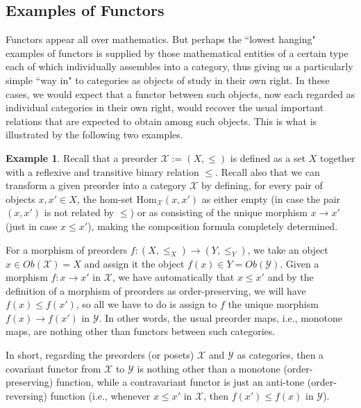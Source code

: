 \documentclass[a4paper]{book}
\theoremstyle{definition}
\newtheorem{example}{Example}[section]
\theoremstyle{definition}
\theoremstyle{definition}
\theoremstyle{theorem}
\theoremstyle{definition}
\begin{document}
\subsection{Examples of Functors}
Functors appear all over mathematics. But perhaps the ``lowest hanging" examples of functors is supplied by those mathematical entities of a certain type each of which individually assembles into a category, thus giving us a particularly simple ``way in" to categories as objects of study in their own right. In these cases, we would expect that a functor between such objects, now each regarded as individual categories in their own right, would recover the usual important relations that are expected to obtain among such objects. This is what is illustrated by the following two examples.   
\begin{example}
	Recall that a preorder $\mathcal{X} := (X, \leq)$ is defined as a set $X$ together with a reflexive and transitive binary relation $\leq$. Recall also that we can transform a given preorder into a category $\mathcal{X}$ by defining, for every pair of objects $x,x' \in X$, the hom-set $\text{Hom}_{\mathcal{X}}(x,x')$ as either empty (in case the pair $(x,x')$ is not related by $\leq$) or as consisting of the unique morphism $x \rightarrow x'$ (just in case $x \leq x'$), making the composition formula completely determined. \par 
	For a morphism of preorders $f: (X, \leq_X) \rightarrow (Y, \leq_Y)$, we take an object $x \in Ob(\mathcal{X}) = X$ and assign it the object $f(x) \in Y = Ob(\mathcal{Y})$. Given a morphism $f: x \rightarrow x'$ in $\mathcal{X}$, we have automatically that $x \leq x'$ and by the definition of a morphism of preorders as order-preserving, we will have $f(x) \leq f(x')$, so all we have to do is assign to $f$ the unique morphism $f(x) \rightarrow f(x')$ in $\mathcal{Y}$. In other words, the usual preorder maps, i.e., monotone maps, are nothing other than functors between such categories. \par 
	In short, regarding the preorders (or posets) $\mathcal{X}$ and $\mathcal{Y}$ as categories, then a covariant functor from $\mathcal{X}$ to $\mathcal{Y}$ is nothing other than a monotone (order-preserving) function, while a contravariant functor is just an anti-tone (order-reversing) function (i.e., whenever $x \leq x'$ in $\mathcal{X}$, then $f(x') \leq f(x)$ in $\mathcal{Y}$).  
	\end{example} 
\end{document}
